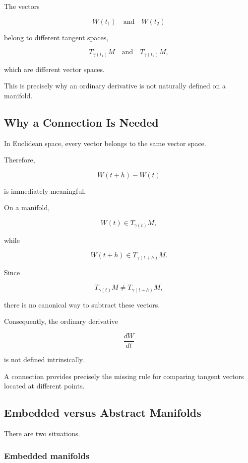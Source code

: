 \documentclass[12pt,a4paper]{article}
\theoremstyle{notespace}
\begin{document}
The vectors

\[
W(t_1)
\quad\text{and}\quad
W(t_2)
\]

belong to different tangent spaces,

\[
T_{\gamma(t_1)}M
\quad\text{and}\quad
T_{\gamma(t_2)}M,
\]

which are different vector spaces.

This is precisely why an ordinary derivative is not naturally defined on
a manifold.


\subsection{Why a Connection Is Needed}

In Euclidean space, every vector belongs to the same vector space.

Therefore,

\[
W(t+h)-W(t)
\]

is immediately meaningful.

On a manifold,

\[
W(t)
\in
T_{\gamma(t)}M,
\]

while

\[
W(t+h)
\in
T_{\gamma(t+h)}M.
\]

Since

\[
T_{\gamma(t)}
M
\neq
T_{\gamma(t+h)}
M,
\]

there is no canonical way to subtract these vectors.

Consequently, the ordinary derivative

\[
\frac{dW}{dt}
\]

is not defined intrinsically.

A connection provides precisely the missing rule for comparing tangent
vectors located at different points.


\subsection{Embedded versus Abstract Manifolds}

There are two situations.

\subsubsection*{Embedded manifolds}
\end{document}
